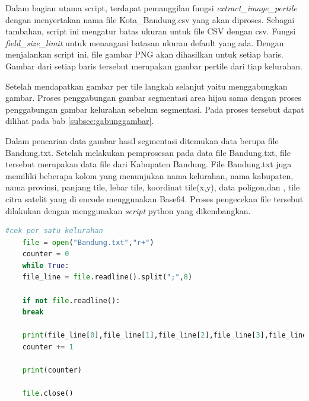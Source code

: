 Dalam bagian utama script, terdapat pemanggilan fungsi \textit{extract\_image\_pertile }dengan menyertakan nama file Kota\_Bandung.csv yang akan diproses. Sebagai tambahan, script ini mengatur batas ukuran untuk file CSV dengan csv. Fungsi \textit{field\_size\_limit} untuk menangani batasan ukuran default yang ada. Dengan menjalankan script ini, file gambar PNG akan dihasilkan untuk setiap baris. Gambar dari setiap baris tersebut merupakan gambar pertile dari tiap kelurahan.

Setelah mendapatkan gambar per tile langkah selanjut yaitu menggabungkan gambar. Proses penggabungan gambar segmentasi area hijau sama dengan proses penggabungan gambar kelurahan sebelum segmentasi. Pada proses tersebut dapat dilihat pada bab \ref{subsec:gabunggambar}.

Dalam pencarian data gambar hasil segmentasi ditemukan data berupa file Bandung.txt. Setelah melakukan pemprosesan pada data file Bandung.txt, file tersebut merupakan data file dari Kabupaten Bandung. File Bandung.txt juga memiliki beberapa kolom yang menunjukan nama kelurahan, nama kabupaten, nama provinsi, panjang tile, lebar tile, koordinat tile(x,y), data poligon,dan , tile citra satelit yang di encode menggunakan Base64. Proses pengecekan file tersebut dilakukan dengan menggunakan \textit{script} python yang dikembangkan.

\begin{lstlisting}[language=Python, caption=Script Pengecekan File .txt,label={code:cekData}]
	#cek per satu kelurahan
	file = open("Bandung.txt","r+")
	counter = 0
	while True:
	file_line = file.readline().split(";",8)
	
	if not file.readline():
	break
	
	print(file_line[0],file_line[1],file_line[2],file_line[3],file_line[4],file_line[5],file_line[6],file_line[7])
	counter += 1

	print(counter)
	
	file.close()
\end{lstlisting}


